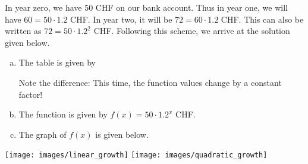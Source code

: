 \begin{solutions}
\begin{solution*}
	In year zero, we have 50 CHF on our bank account.
	Thus in year one, we will have $60=50\cdot 1.2$ CHF.
	In year two, it will be $72=60\cdot 1.2$ CHF.
	This can also be written as $72=50\cdot 1.2^2$ CHF.
	Following this scheme, we arrive at the solution given below.
	\begin{enumerate}[a)]
		\item The table is given by
		\begin{center}
		\end{center}
		Note the difference: This time, the function values change by a constant factor!
		\item The function is given by $f\left(x\right)=50\cdot 1.2^x$ CHF.
		\item The graph of $f\left(x\right)$ is given below.
	\end{enumerate}
	\begin{center}
		\texttt{[image: images/linear\_growth]}\hfill
		\texttt{[image: images/quadratic\_growth]}
	\end{center}
\end{solution*}
\end{solutions}
